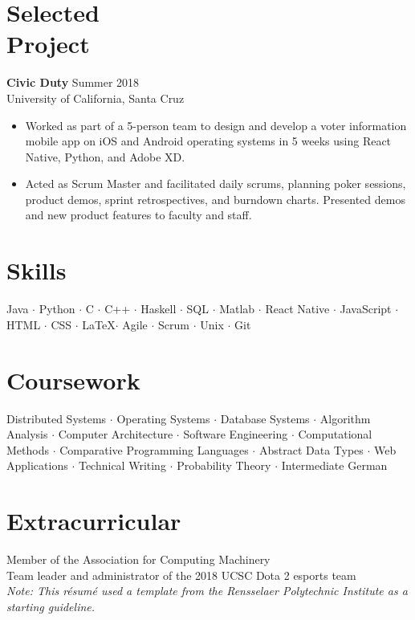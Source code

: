 \documentclass[margin]{res}
\begin{document}
\begin{resume}
\section{Selected\\Project}
{\bf Civic Duty} \hfill Summer 2018 \\
University of California, Santa Cruz \\
\begin{itemize} \itemsep -1pt 
\item Worked as part of a 5-person team to design and develop a voter information mobile app on iOS and Android operating systems in 5 weeks using React Native, Python, and Adobe XD.
\item Acted as Scrum Master and facilitated daily scrums, planning poker sessions, product demos, sprint retrospectives, and burndown charts. Presented demos and new product features to faculty and staff.
\end{itemize}

\section{Skills}
Java $\cdot$ Python $\cdot$ C $\cdot$ C++ $\cdot$ Haskell $\cdot$ SQL $\cdot$ Matlab $\cdot$ React Native $\cdot$ JavaScript $\cdot$ HTML $\cdot$ CSS $\cdot$ \LaTeX $\cdot$ Agile $\cdot$ Scrum $\cdot$ Unix $\cdot$ Git
 
\section{Coursework}
 Distributed Systems $\cdot$ Operating Systems $\cdot$ Database Systems $\cdot$ Algorithm Analysis $\cdot$ Computer Architecture $\cdot$ Software Engineering $\cdot$ Computational Methods $\cdot$ Comparative Programming Languages $\cdot$ Abstract Data Types $\cdot$ Web Applications $\cdot$ Technical Writing $\cdot$ Probability Theory $\cdot$ Intermediate German

\section{Extracurricular}
Member of the Association for Computing Machinery \\
Team leader and administrator of the 2018 UCSC Dota 2 esports team \\

\textit{Note: This r\'esum\'e used a template from the Rensselaer Polytechnic Institute as a starting guideline.}


\end{resume} 
\end{document}
